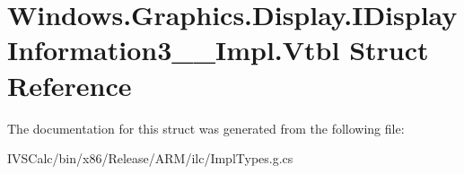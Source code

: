 \hypertarget{struct_windows_1_1_graphics_1_1_display_1_1_i_display_information3_____impl_1_1_vtbl}{}\section{Windows.\+Graphics.\+Display.\+I\+Display\+Information3\+\_\+\+\_\+\+Impl.\+Vtbl Struct Reference}
\label{struct_windows_1_1_graphics_1_1_display_1_1_i_display_information3_____impl_1_1_vtbl}


The documentation for this struct was generated from the following file\+:\begin{DoxyCompactItemize}
\item 
I\+V\+S\+Calc/bin/x86/\+Release/\+A\+R\+M/ilc/Impl\+Types.\+g.\+cs\end{DoxyCompactItemize}
